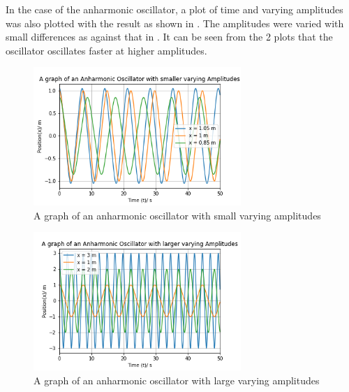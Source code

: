 \documentclass[11pt]{article}
\begin{document}
	In the case of the anharmonic oscillator, a plot of time and varying amplitudes was also plotted with the result as shown in . The amplitudes were varied with small differences as against that in . It can be seen from the 2 plots that the oscillator oscillates faster at higher amplitudes.
	
	\begin{figure}[!h]\begin{center} 
			\vspace{12pt}
			\includegraphics[width=0.7\textwidth]{anharmonic1.png} 
			\caption{A graph of an anharmonic oscillator with small varying amplitudes }
			\label{fig:anharmonic1} 
		\end{center}
	\end{figure}

\begin{figure}[!h]\begin{center} 
		\vspace{12pt}
		\includegraphics[width=0.7\textwidth]{anharmonic2.png} 
		\caption{A graph of an anharmonic oscillator with large varying amplitudes }
		\label{fig:anharmonic2} 
	\end{center}
\end{figure}
\end{document}
